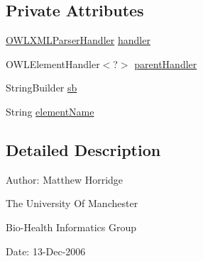 \subsection*{Private Attributes}
\begin{DoxyCompactItemize}
\item 
\hyperlink{classorg_1_1coode_1_1owlapi_1_1owlxmlparser_1_1_o_w_l_x_m_l_parser_handler}{O\-W\-L\-X\-M\-L\-Parser\-Handler} \hyperlink{classorg_1_1coode_1_1owlapi_1_1owlxmlparser_1_1_abstract_o_w_l_element_handler_3_01_o_01_4_a31af09b1e669cbfabf238feed83333e0}{handler}
\item 
O\-W\-L\-Element\-Handler$<$?$>$ \hyperlink{classorg_1_1coode_1_1owlapi_1_1owlxmlparser_1_1_abstract_o_w_l_element_handler_3_01_o_01_4_a9a2f5d6be585e721a09d2b1659f77ea4}{parent\-Handler}
\item 
String\-Builder \hyperlink{classorg_1_1coode_1_1owlapi_1_1owlxmlparser_1_1_abstract_o_w_l_element_handler_3_01_o_01_4_a43c0deb7f569bbb46313a7d023858c25}{sb}
\item 
String \hyperlink{classorg_1_1coode_1_1owlapi_1_1owlxmlparser_1_1_abstract_o_w_l_element_handler_3_01_o_01_4_aca03b7a8105e5c4cabd176d092aeea0e}{element\-Name}
\end{DoxyCompactItemize}


\subsection{Detailed Description}
Author\-: Matthew Horridge\par
 The University Of Manchester\par
 Bio-\/\-Health Informatics Group\par
 Date\-: 13-\/\-Dec-\/2006\par
 \par
 

